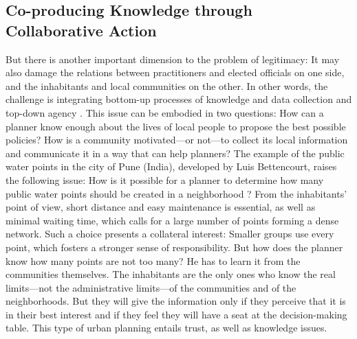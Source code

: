 \documentclass[10pt,a4paper]{article}
\begin{document}
\begin{multicols}{2}
\subsection{Co-producing Knowledge through Collaborative Action}
\noindent {}

But there is another important dimension to the problem of legitimacy: It may also damage the relations between practitioners and elected officials on one side, and the inhabitants and local communities on the other. In other words, the challenge is integrating bottom-up processes of knowledge and data collection and top-down agency \citep{r124}. This issue can be embodied in two questions: How can a planner know enough about the lives of local people to propose the best possible policies? How is a community motivated---or not---to collect its local information and communicate it in a way that can help planners? The example of the public water points in the city of Pune (India), developed by Luis Bettencourt, raises the following issue: How is it possible for a planner to determine how many public water points should be created in a neighborhood \citep{r125, r126}? From the inhabitants' point of view, short distance and easy maintenance is essential, as well as minimal waiting time, which calls for a large number of points forming a dense network. Such a choice presents a collateral interest: Smaller groups use every point, which fosters a stronger sense of responsibility. But how does the planner know how many points are not too many? He has to learn it from the communities themselves. The inhabitants are the only ones who know the real limits---not the administrative limits---of the communities and of the neighborhoods. But they will give the information only if they perceive that it is in their best interest and if they feel they will have a seat at the decision-making table. This type of urban planning entails trust, as well as knowledge issues.


\end{multicols}
\end{document}
